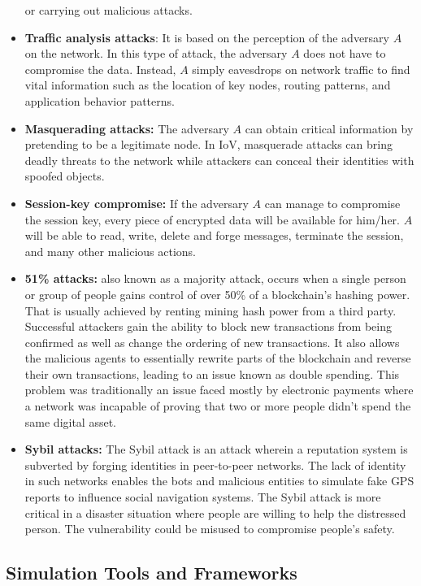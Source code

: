 \begin{itemize}
					or carrying out malicious attacks.
					\item \textbf{Traffic analysis attacks}: It is based on the perception of the adversary $A$ on the network. In this type of attack, the adversary $A$ does not have to compromise the data. Instead, $A$ simply eavesdrops on network traffic to find vital information such as the location of key nodes, routing patterns, and application behavior patterns.
					\item \textbf{Masquerading attacks:} The adversary $A$ can obtain critical information by pretending to be a legitimate node. In IoV, masquerade attacks can bring deadly threats to the network while attackers can conceal their identities with spoofed objects.
					\item \textbf{Session-key compromise:} If the adversary $A$ can manage to compromise the session key, every piece of encrypted data will be available for him/her. $A$ will be able to read, write, delete and forge messages, terminate the session, and many other malicious actions.
					\item \textbf{51\% attacks:} also known as a majority attack, occurs when a single person or group of people gains control of over 50\% of a blockchain’s hashing power. That is usually achieved by renting mining hash power from a third party. Successful attackers gain the ability to block new transactions from being confirmed as well as change the ordering of new transactions. It also allows the malicious agents to essentially rewrite parts of the blockchain and reverse their own transactions, leading to an issue known as double spending. This problem was traditionally an issue faced mostly by electronic payments where a network was incapable of proving that two or more people didn’t spend the same digital asset. 
					\item \textbf{Sybil attacks:} The Sybil attack is an attack wherein a reputation system is subverted by forging identities in peer-to-peer networks. The lack of identity in such networks enables the bots and malicious entities to simulate fake GPS reports to influence social navigation systems. The Sybil attack is more critical in a disaster situation where people are willing to help the distressed person. The vulnerability could be misused to compromise people's safety. 
				\end{itemize} 
			
			\subsection{Simulation Tools and Frameworks}
